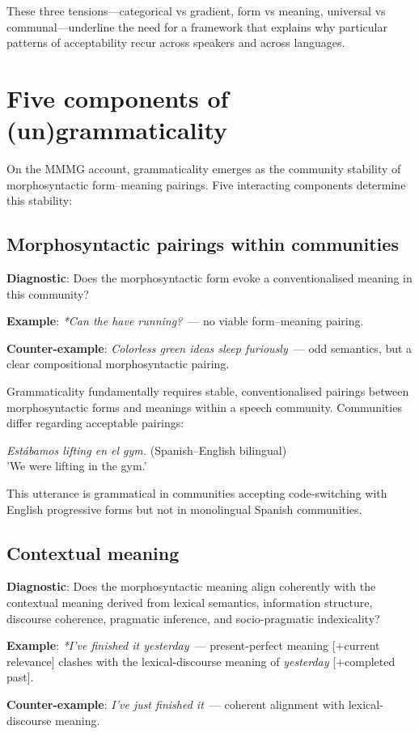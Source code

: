 \documentclass[12pt]{article}
\begin{document}
\medskip
These three tensions—categorical vs gradient, form vs meaning, universal vs communal—underline the need for a framework that explains why particular patterns of acceptability recur across speakers and across languages.


\section{Five components of (un)grammaticality}

On the MMMG account, grammaticality emerges as the community stability of morphosyntactic form–meaning pairings. Five interacting components determine this stability:

\subsection{Morphosyntactic pairings within communities}

\begin{tcolorbox}[colback=lsLightBlue!30]
\textbf{Diagnostic}: Does the morphosyntactic form evoke a conventionalised meaning in this community?

\textbf{Example}: \textit{*Can the have running?}~— no viable form–meaning pairing.

\textbf{Counter-example}: \textit{Colorless green ideas sleep furiously}~— odd semantics, but a clear compositional morphosyntactic pairing.
\end{tcolorbox}

Grammaticality fundamentally requires stable, conventionalised pairings between morphosyntactic forms and meanings within a speech community. Communities differ regarding acceptable pairings:

\ea
\textit{Estábamos lifting en el gym.} (Spanish–English bilingual)\\
'We were lifting in the gym.'
\z

This utterance is grammatical in communities accepting code-switching with English progressive forms but not in monolingual Spanish communities.

\subsection{Contextual meaning}

\begin{tcolorbox}[colback=lsLightBlue!30]
\textbf{Diagnostic}: Does the morphosyntactic meaning align coherently with the contextual meaning derived from lexical semantics, information structure, discourse coherence, pragmatic inference, and socio-pragmatic indexicality?

\textbf{Example}: \textit{*I've finished it yesterday}~— present-perfect meaning [+current relevance] clashes with the lexical-discourse meaning of \textit{yesterday} [+completed past].

\textbf{Counter-example}: \textit{I've just finished it}~— coherent alignment with lexical-discourse meaning.
\end{tcolorbox}
\end{document}
